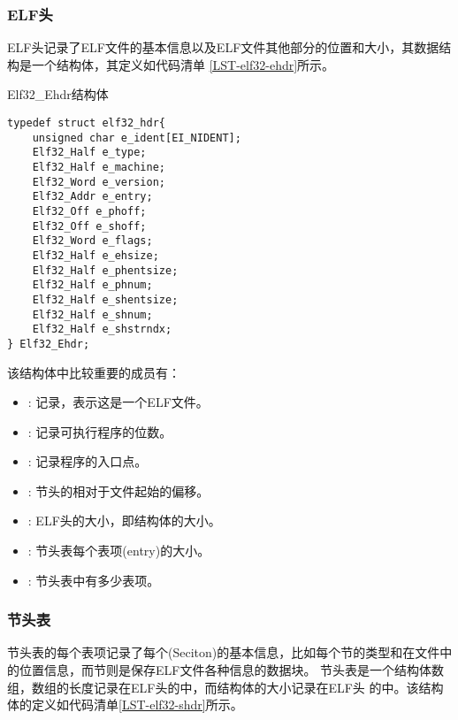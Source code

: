 \subsubsection{ELF头}

ELF头记录了ELF文件的基本信息以及ELF文件其他部分的位置和大小，其数据结构是一个结构体，其定义如代码清单
\ref{LST-elf32-ehdr}所示。

\begin{listing}
\caption{Elf32\_Ehdr结构体}
\label{LST-elf32-ehdr}
\begin{verbatim}
typedef struct elf32_hdr{
    unsigned char e_ident[EI_NIDENT];
    Elf32_Half e_type;
    Elf32_Half e_machine;
    Elf32_Word e_version;
    Elf32_Addr e_entry; 
    Elf32_Off e_phoff;
    Elf32_Off e_shoff;
    Elf32_Word e_flags;
    Elf32_Half e_ehsize;
    Elf32_Half e_phentsize;
    Elf32_Half e_phnum;
    Elf32_Half e_shentsize;
    Elf32_Half e_shnum;
    Elf32_Half e_shstrndx;
} Elf32_Ehdr;
\end{verbatim}
\end{listing}

该结构体中比较重要的成员有：
\begin{itemize}
    \item {}: 记录，表示这是一个ELF文件。
    \item {}: 记录可执行程序的位数。
    \item {}: 记录程序的入口点。
    \item {}: 节头的相对于文件起始的偏移。
    \item {}: ELF头的大小，即结构体的大小。
    \item {}: 节头表每个表项(entry)的大小。
    \item {}: 节头表中有多少表项。
\end{itemize}

\subsubsection{节头表}

节头表的每个表项记录了每个(Seciton)的基本信息，比如每个节的类型和在文件中的位置信息，而节则是保存ELF文件各种信息的数据块。
节头表是一个结构体数组，数组的长度记录在ELF头的中，而结构体的大小记录在ELF头
的中。该结构体的定义如代码清单\ref{LST-elf32-shdr}所示。

